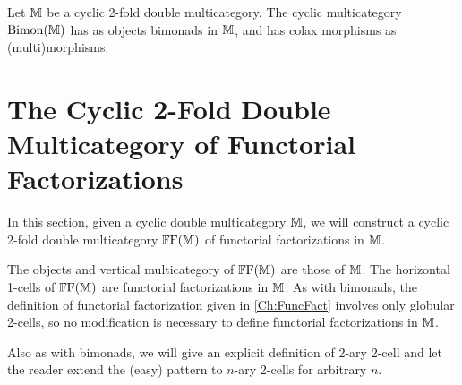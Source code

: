 \begin{definition}
	Let $\mathbb{M}$ be a cyclic 2-fold double multicategory. The cyclic multicategory $\mathrm{Bimon}(\mathbb{M})$ has as objects bimonads in $\mathbb{M}$, and has colax morphisms as (multi)morphisms.
\end{definition}

\section{The Cyclic 2-Fold Double Multicategory of Functorial Factorizations}

In this section, given a cyclic double multicategory $\mathbb{M}$, we will construct a cyclic 2-fold double multicategory $\mathbb{F}\mathrm{F}(\mathbb{M})$ of functorial factorizations in $\mathbb{M}$.

The objects and vertical multicategory of $\mathbb{F}\mathrm{F}(\mathbb{M})$ are those of $\mathbb{M}$. The horizontal 1-cells of $\mathbb{F}\mathrm{F}(\mathbb{M})$ are functorial factorizations in $\mathbb{M}$. As with bimonads, the definition of functorial factorization given in \cref{Ch:FuncFact} involves only globular 2-cells, so no modification is necessary to define functorial factorizations in $\mathbb{M}$.

Also as with bimonads, we will give an explicit definition of 2-ary 2-cell and let the reader extend the (easy) pattern to $n$-ary 2-cells for arbitrary $n$.

